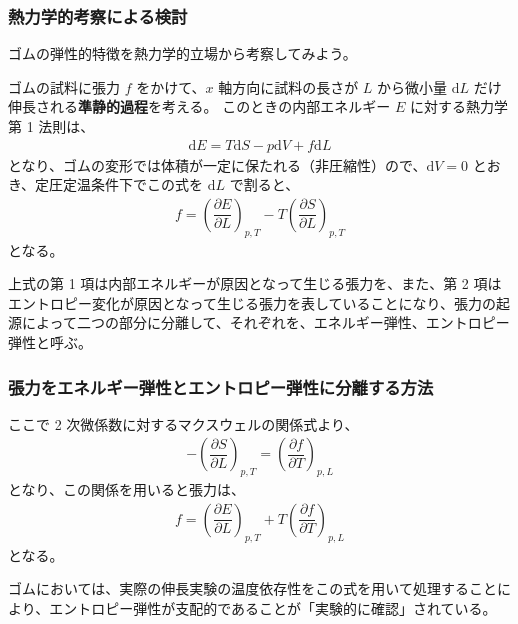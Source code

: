 \documentclass[uplatex,dvipdfmx,a4paper,11pt, titlepage]{jsarticle}
\newcommand{\diff}{\mathrm d}
\newcommand{\difp}[2]{\dfrac{\partial #1}{\partial #2}}
\begin{document}
\subsubsection{熱力学的考察による検討}

ゴムの弾性的特徴を熱力学的立場から考察してみよう。

ゴムの試料に張力 $f$ をかけて、$x$ 軸方向に試料の長さが $L$ から微小量 $\diff L$ だけ伸長される{\bf 準静的過程}を考える。
このときの内部エネルギー $E$ に対する熱力学第 1 法則は、
\begin{align*}
	\diff E = T \diff S − p \diff V + f \diff L
\end{align*}
となり、ゴムの変形では体積が一定に保たれる（非圧縮性）ので、$\diff V = 0$ とおき、定圧定温条件下でこの式を $\diff L$ で割ると、
\begin{align*}
f = \left( \difp{E}{L} \right)_{p, T} -T\left( \difp{S}{L} \right)_{p, T}
\end{align*}
となる。

上式の第 1 項は内部エネルギーが原因となって生じる張力を、また、第 2 項はエントロピー変化が原因となって生じる張力を表していることになり、張力の起源によって二つの部分に分離して、それぞれを、エネルギー弾性、エントロピー弾性と呼ぶ。


\subsubsection{張力をエネルギー弾性とエントロピー弾性に分離する方法}

ここで 2 次微係数に対するマクスウェルの関係式より、
\begin{align*}
- \left( \difp{S}{L} \right)_{p, T} = \left( \difp{f}{T} \right)_{p, L}
\end{align*}
となり、この関係を用いると張力は、
\begin{align*}
f = \left( \difp{E}{L} \right)_{p, T} + T \left( \difp{f}{T} \right)_{p, L}
\end{align*}
となる。

ゴムにおいては、実際の伸長実験の温度依存性をこの式を用いて処理することにより、エントロピー弾性が支配的であることが「実験的に確認」されている。

%
%
%
%
\end{document}
